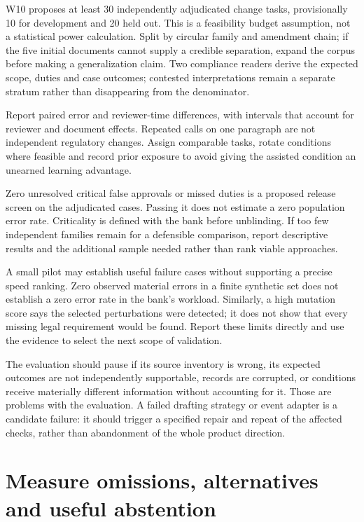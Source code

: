 W10 proposes at least 30 independently adjudicated change tasks, provisionally
10 for development and 20 held out. This is a feasibility budget assumption,
not a statistical power calculation. Split by circular family and amendment
chain; if the five initial documents cannot supply a credible separation, expand
the corpus before making a generalization claim. Two compliance readers derive
the expected scope, duties and case outcomes; contested interpretations remain
a separate stratum rather than disappearing from the denominator.

Report paired error and reviewer-time differences, with intervals that account
for reviewer and document effects. Repeated calls on one paragraph are not
independent regulatory changes. Assign comparable tasks, rotate conditions where
feasible and record prior exposure to avoid giving the assisted condition an
unearned learning advantage.


Zero unresolved critical false approvals or missed duties is a proposed release
screen on the adjudicated cases. Passing it does not estimate a zero population
error rate. Criticality is defined with the bank before unblinding. If too few
independent families remain for a defensible comparison, report descriptive
results and the additional sample needed rather than rank viable approaches.

A small pilot may establish useful failure cases without supporting a precise
speed ranking. Zero observed material errors in a finite synthetic set does not
establish a zero error rate in the bank's workload. Similarly, a high mutation
score says the selected perturbations were detected; it does not show that every
missing legal requirement would be found. Report these limits directly and use
the evidence to select the next scope of validation.

The evaluation should pause if its source inventory is wrong, its expected
outcomes are not independently supportable, records are corrupted, or conditions
receive materially different information without accounting for it. Those are
problems with the evaluation. A failed drafting strategy or event adapter is a
candidate failure: it should trigger a specified repair and repeat of the affected
checks, rather than abandonment of the whole product direction.

\section{Measure omissions, alternatives and useful abstention}
\label{merge:M09:05}


